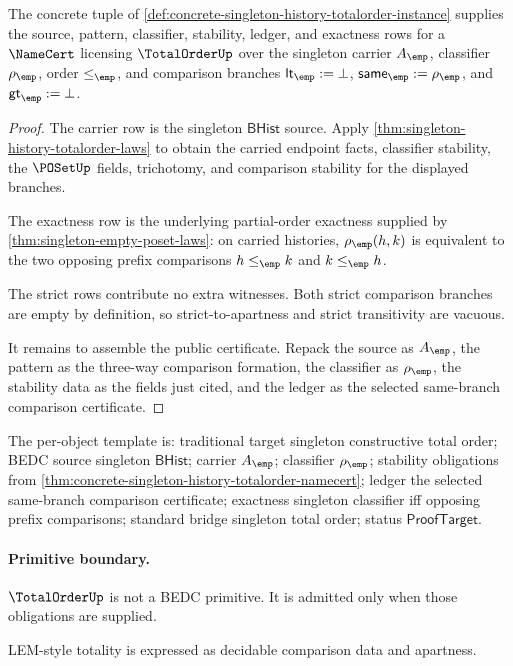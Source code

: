 \begin{theorem}
\label{thm:concrete-singleton-history-totalorder-namecert}
The concrete tuple of
\autoref{def:concrete-singleton-history-totalorder-instance} supplies the
source, pattern, classifier, stability, ledger, and exactness rows for a
$\NameCert$ licensing $\TotalOrderUp$ over the singleton carrier $A_{\emp}$,
classifier $\rho_{\emp}$, order $\le_{\emp}$, and comparison branches
$\mathsf{lt}_{\emp}:=\bot$, $\mathsf{same}_{\emp}:=\rho_{\emp}$, and
$\mathsf{gt}_{\emp}:=\bot$.
\end{theorem}
\begin{proof}
The carrier row is the singleton $\mathsf{BHist}$ source. Apply
\autoref{thm:singleton-history-totalorder-laws} to obtain the carried endpoint
facts, classifier stability, the $\POSetUp$ fields, trichotomy, and comparison
stability for the displayed branches.

The exactness row is the underlying partial-order exactness supplied by
\autoref{thm:singleton-empty-poset-laws}: on carried histories,
$\rho_{\emp}(h,k)$ is equivalent to the two opposing prefix comparisons
$h\le_{\emp}k$ and $k\le_{\emp}h$.

The strict rows contribute no extra witnesses. Both strict comparison branches
are empty by definition, so strict-to-apartness and strict transitivity are
vacuous.

It remains to assemble the public certificate. Repack the source as
$A_{\emp}$, the pattern as the three-way comparison formation, the classifier
as $\rho_{\emp}$, the stability data as the fields just cited, and the ledger
as the selected same-branch comparison certificate.
\end{proof}

The per-object template is: traditional target singleton constructive total
order; BEDC source singleton $\mathsf{BHist}$; carrier $A_{\emp}$; classifier
$\rho_{\emp}$; stability obligations from
\autoref{thm:concrete-singleton-history-totalorder-namecert}; ledger the
selected same-branch comparison certificate; exactness singleton classifier
iff opposing prefix comparisons; standard bridge singleton total order; status
$\mathsf{ProofTarget}$.

\paragraph{Primitive boundary.}
\(\TotalOrderUp\) is not a BEDC primitive. It is admitted only when those obligations are supplied.

\begin{remark}
\label{rem:totalorder-zero-axiom-note}
LEM-style totality is expressed as decidable comparison data and apartness.
\end{remark}
